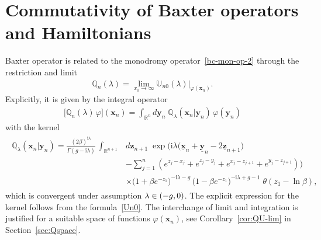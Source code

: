 \documentclass[11pt]{article}
\numberwithin{equation}{section}
\theoremstyle{plain}
\theoremstyle{definition}
\newcommand{\QQ}{\mathbb{Q}}
\newcommand{\MMO}{\mathbb{U}}
\let\Im\relax
\DeclareMathOperator{\Im}{Im}
\renewcommand{\phi}{\varphi}
\renewcommand{\imath}{\mathrm{i}}
\begin{document}
\section{Commutativity of Baxter operators and Hamiltonians} \label{sec:QB-comm}

Baxter operator is related to the monodromy operator~\eqref{bc-mon-op-2} through the restriction and limit 
\begin{align} \label{Q-def}
	\QQ_n(\lambda) = \lim_{x_{0} \to \infty} \MMO_{n 0}(\lambda) \bigr|_{\phi(\bm{x}_n)}.
\end{align}
Explicitly, it is given by the integral operator
\begin{align}
	\bigl[ \QQ_n(\lambda) \, \phi \bigr] (\bm{x}_n) = \int_{\mathbb{R}^{n}} d\bm{y}_{n} \; \QQ_\lambda(\bm{x}_n | \bm{y}_{n}) \, \phi(\bm{y}_{n})
\end{align}
with the kernel
\begin{align}
	\begin{aligned}
		\QQ_\lambda(\bm{x}_n | \bm{y}_{n}) =  \frac{(2\beta)^{\imath \lambda}}{\Gamma(g - \imath \lambda)} \, \int_{\mathbb{R}^{n + 1}} & d\bm{z}_{n + 1} \; \exp \biggl( \imath \lambda \bigl( \underline{\bm{x}}_n + \underline{\bm{y}}_{n} - 2 \underline{\bm{z}}_{n + 1} \bigr) \\[6pt]
		&  - \sum_{j = 1}^{n} (e^{z_j - x_j} + e^{z_j - y_j} + e^{x_j - z_{j + 1}} + e^{y_j - z_{j + 1}} ) \biggr) \\[6pt]
		&  \times \bigl(1 + \beta e^{-z_1}\bigr)^{- \imath \lambda - g } \, \bigl(1 - \beta e^{-z_1}\bigr)^{- \imath \lambda + g - 1 } \; \theta(z_1 - \ln \beta),
	\end{aligned}
\end{align}
which is convergent under assumption $\Im \lambda \in (-g, 0)$. The explicit expression for the kernel follows from the formula~\eqref{Un0}. The interchange of limit and integration is justified for a suitable space of functions $\phi(\bm{x}_n)$, see Corollary~\ref{cor:QU-lim} in Section~\ref{sec:Qspace}.
 
\end{document}
